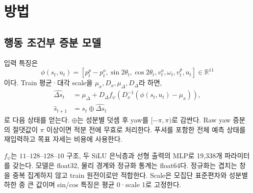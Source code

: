 \documentclass[conference,a4paper]{IEEEtran}
\newcommand{\R}{\mathbb{R}}
\begin{document}
\section{방법}\label{sec:method}
\subsection{행동 조건부 증분 모델}
입력 특징은
\begin{equation}
\phi(s_t,u_t)=[p_t^p-p_t^o,\sin2\theta_t,\cos2\theta_t,
v_t^o,\omega_t,v_t^p,u_t]\in\R^{11}
\label{eq:feature}
\end{equation}
이다.
Train 평균·대각 scale을 $\mu_x,D_x,\mu_\Delta,D_\Delta$라 하면,
\begin{align}
\widehat{\Delta s}_t&=\mu_\Delta+D_\Delta
 f_\psi\!\left(D_x^{-1}(\phi(s_t,u_t)-\mu_x)\right),\label{eq:model}\\
\hat s_{t+1}&=s_t\oplus\widehat{\Delta s}_t \label{eq:integrate}
\end{align}
로 다음 상태를 얻는다.
$\oplus$는 성분별 덧셈 후 yaw를 $[-\pi,\pi)$로 감싼다.
Raw yaw 증분의 절댓값이 $\pi$ 이상이면 적분 전에 무효로 처리한다.
푸셔를 포함한 전체 예측 상태를 재입력하고 목표 자세는 비용에 사용한다.

$f_\psi$는 $11$--$128$--$128$--$10$ 구조, 두 SiLU 은닉층과 선형 출력의 MLP로 19,338개 파라미터를 갖는다.
모델은 float32, 물리 경계와 정규화 통계는 float64다.
정규화는 겹치는 창을 중복 집계하지 않고 train 원전이로만 적합한다.
Scale은 모집단 표준편차와 성분별 하한 중 큰 값이며 sin/cos 특징은 평균 0·scale 1로 고정한다.
\end{document}

